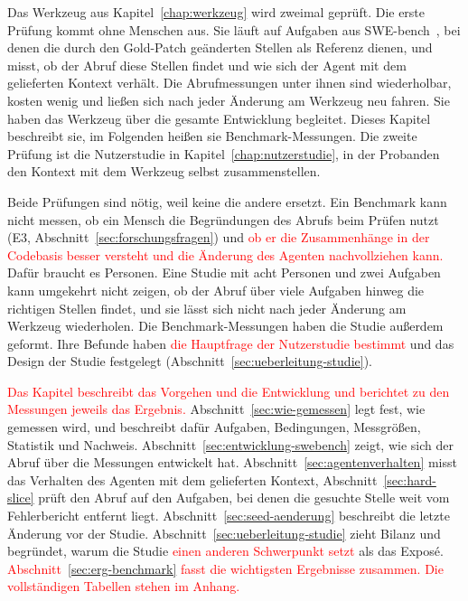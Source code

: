 \begin{ungelesen}
Das Werkzeug aus Kapitel~\ref{chap:werkzeug} wird zweimal geprüft. Die erste Prüfung kommt ohne Menschen aus. Sie läuft auf Aufgaben aus SWE-bench~\parencite{jimenez2024swebench}, bei denen die durch den Gold-Patch geänderten Stellen als Referenz dienen, und misst, ob der Abruf diese Stellen findet und wie sich der Agent mit dem gelieferten Kontext verhält. Die Abrufmessungen unter ihnen sind wiederholbar, kosten wenig und ließen sich nach jeder Änderung am Werkzeug neu fahren. Sie haben das Werkzeug über die gesamte Entwicklung begleitet. Dieses Kapitel beschreibt sie, im Folgenden heißen sie Benchmark-Messungen. Die zweite Prüfung ist die Nutzerstudie in Kapitel~\ref{chap:nutzerstudie}, in der Probanden den Kontext mit dem Werkzeug selbst zusammenstellen.

Beide Prüfungen sind nötig, weil keine die andere ersetzt. Ein Benchmark kann nicht messen, ob ein Mensch die Begründungen des Abrufs beim Prüfen nutzt (E3, Abschnitt~\ref{sec:forschungsfragen}) und \textcolor{red}{ob er die Zusammenhänge in der Codebasis besser versteht und die Änderung des Agenten nachvollziehen kann.} Dafür braucht es Personen. Eine Studie mit acht Personen und zwei Aufgaben kann umgekehrt nicht zeigen, ob der Abruf über viele Aufgaben hinweg die richtigen Stellen findet, und sie lässt sich nicht nach jeder Änderung am Werkzeug wiederholen. Die Benchmark-Messungen haben die Studie außerdem geformt. Ihre Befunde haben \textcolor{red}{die Hauptfrage der Nutzerstudie bestimmt} und das Design der Studie festgelegt (Abschnitt~\ref{sec:ueberleitung-studie}).

\textcolor{red}{Das Kapitel beschreibt das Vorgehen und die Entwicklung und berichtet zu den Messungen jeweils das Ergebnis.} Abschnitt~\ref{sec:wie-gemessen} legt fest, wie gemessen wird, und beschreibt dafür Aufgaben, Bedingungen, Messgrößen, Statistik und Nachweis. Abschnitt~\ref{sec:entwicklung-swebench} zeigt, wie sich der Abruf über die Messungen entwickelt hat. Abschnitt~\ref{sec:agentenverhalten} misst das Verhalten des Agenten mit dem gelieferten Kontext, Abschnitt~\ref{sec:hard-slice} prüft den Abruf auf den Aufgaben, bei denen die gesuchte Stelle weit vom Fehlerbericht entfernt liegt. Abschnitt~\ref{sec:seed-aenderung} beschreibt die letzte Änderung vor der Studie. Abschnitt~\ref{sec:ueberleitung-studie} zieht Bilanz und begründet, warum die Studie \textcolor{red}{einen anderen Schwerpunkt setzt} als das Exposé. \textcolor{red}{Abschnitt~\ref{sec:erg-benchmark} fasst die wichtigsten Ergebnisse zusammen. Die vollständigen Tabellen stehen im Anhang.}
\end{ungelesen}

